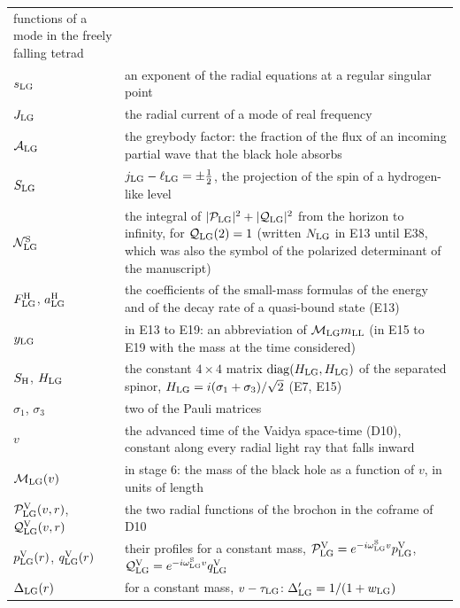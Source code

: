 \documentclass[
  10pt,
]{article}
\begin{document}
\begin{longtable}[]{@{}
  >{\raggedright\arraybackslash}p{}
  >{\raggedright\arraybackslash}p{}@{}}
functions of a mode in the freely falling tetrad \\
\(s_{\rm LG}\) & an exponent of the radial equations at a regular
singular point \\
\(J_{\rm LG}\) & the radial current of a mode of real frequency \\
\(\mathcal A_{\rm LG}\) & the greybody factor: the fraction of the flux
of an incoming partial wave that the black hole absorbs \\
\(S_{\rm LG}\) & \(j_{\rm LG}-\ell_{\rm LG}=\pm\tfrac12\), the
projection of the spin of a hydrogen-like level \\
\(\mathcal N^{\rm S}_{\rm LG}\) & the integral of
\(\lvert\mathcal P_{\rm LG}\rvert^2+\lvert\mathcal Q_{\rm LG}\rvert^2\)
from the horizon to infinity, for \(\mathcal Q_{\rm LG}(2)=1\) (written
\(N_{\rm LG}\) in E13 until E38, which was also the symbol of the
polarized determinant of the manuscript) \\
\(F^{\rm H}_{\rm LG}\), \(a^{\rm H}_{\rm LG}\) & the coefficients of the
small-mass formulas of the energy and of the decay rate of a quasi-bound
state (E13) \\
\(y_{\rm LG}\) & in E13 to E19: an abbreviation of
\(\mathcal M_{\rm LG}m_{\rm LL}\) (in E15 to E19 with the mass at the
time considered) \\
\(S_{\rm H}\), \(H_{\rm LG}\) & the constant \(4\times4\) matrix
\(\mathrm{diag}(H_{\rm LG},H_{\rm LG})\) of the separated spinor,
\(H_{\rm LG}=i(\sigma_1+\sigma_3)/\sqrt2\) (E7, E15) \\
\(\sigma_1\), \(\sigma_3\) & two of the Pauli matrices \\
\(v\) & the advanced time of the Vaidya space-time (D10), constant along
every radial light ray that falls inward \\
\(\mathcal M_{\rm LG}(v)\) & in stage 6: the mass of the black hole as a
function of \(v\), in units of length \\
\(\mathcal P^{\rm V}_{\rm LG}(v,r)\),
\(\mathcal Q^{\rm V}_{\rm LG}(v,r)\) & the two radial functions of the
brochon in the coframe of D10 \\
\(p^{\rm V}_{\rm LG}(r)\), \(q^{\rm V}_{\rm LG}(r)\) & their profiles
for a constant mass,
\(\mathcal P^{\rm V}_{\rm LG}=e^{-i\omega^{\rm S}_{\rm LG}v}p^{\rm V}_{\rm LG}\),
\(\mathcal Q^{\rm V}_{\rm LG}=e^{-i\omega^{\rm S}_{\rm LG}v}q^{\rm V}_{\rm LG}\) \\
\(\Delta_{\rm LG}(r)\) & for a constant mass, \(v-\tau_{\rm LG}\):
\(\Delta_{\rm LG}'=1/(1+w_{\rm LG})\) \\

\end{longtable}
\end{document}
